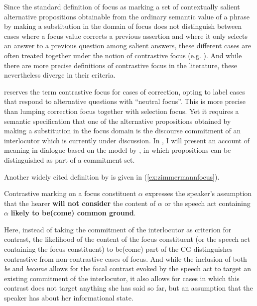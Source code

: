 Since the standard definition of focus as marking a set of contextually salient alternative propositions obtainable from the ordinary semantic value of a phrase by making a substitution in the domain of focus \citep[76]{Rooth1992} does not distinguish between cases where a focus value corrects a previous assertion and where it only selects an answer to a previous question among salient answers, these different cases are often treated together under the notion of contrastive focus (e.g. \cite{Lee.2017}). And while there are more precise definitions of contrastive focus in the literature, these nevertheless diverge in their criteria.

\citet[54]{Gabriel2007} reserves the term contrastive focus for cases of correction, opting to label cases that respond to alternative questions with ``neutral focus''. This is more precise than lumping correction focus together with selection focus. Yet it requires a semantic specification that one of the alternative propositions obtained by making a substitution in the focus domain is the discourse commitment of an interlocutor which is currently under discussion. In , I will present an account of meaning in dialogue based on the model by \citet{FarkasBruce.2010}, in which propositions can be distinguished as part of a commitment set.

Another widely cited definition by \citet{Zimmermann.2008} is given in (\ref{ex:zimmermannfocus}).

\begin{exe}
	\ex \label{ex:zimmermannfocus} 
	Contrastive marking on a focus constituent $\alpha$ expresses the speaker's assumption that the hearer \textbf{will not consider} the content of $\alpha$ or the speech act containing $\alpha$ \textbf{likely to be(come) common ground}.\\\hbox{}\hfill\hbox{\citep[354]{Zimmermann.2008}}
\end{exe}

Here, instead of taking the commitment of the interlocutor as criterion for contrast, the likelihood of the content of the focus constituent (or the speech act containing the focus constituent) to be(come) part of the \ac{CG} distinguishes contrastive from non-con\-tras\-tive cases of focus. And while the inclusion of both \textit{be} and \textit{become} allows for the focal contrast evoked by the speech act to target an existing commitment of the interlocutor, it also allows for cases in which this contrast does not target anything she has said so far, but an assumption that the speaker has about her informational state. 

